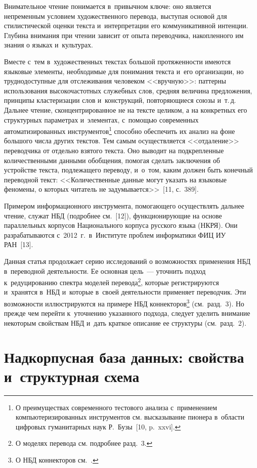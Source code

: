 \begin{multicols}{2}
  Внимательное чтение понимается в~привычном ключе: оно является 
непременным условием художественного перевода, выступая основой для 
стилистической оценки текста и~интерпретации его коммуникативной 
интенции. Глубина внимания при чтении зависит от опыта переводчика, 
накопленного им знания о языках и~культурах.
  
  Вместе с~тем в~художественных текстах большой протяженности имеются 
языковые элементы, необходимые для понимания текста и~его организации, 
но труднодоступные для отслеживания человеком <<вручную>>: паттерны 
использования высокочастотных служебных слов, средняя величина 
предложения, принципы кластеризации слов и~конструкций, повторяющиеся 
союзы и~т.\,д. Дальнее чтение, сконцентрированное не на тексте целиком, а 
на конкретных его структурных параметрах и~элементах, с~помощью 
современных автоматизированных инструментов\footnote[1]{О преимуществах 
современного тестового анализа с~применением компьютеризированных 
инструментов см. высказывание пионера в~области цифровых гуманитарных 
наук Р.~Бузы~[10, p.~xxvi].} способно обеспечить их анализ на фоне 
большого числа других текстов. Тем самым осуществляется <<отдаление>> 
переводчика от отдельно взятого текста. Оно выводит на подкрепленные 
количественными данными обобщения, помогая сделать заключения об 
устройстве текста, подлежащего переводу, и~о~том, каким должен быть 
конечный переводной текст: <<Количественные данные могут указать на 
языковые феномены, о которых читатель не задумывается>>~[11, с.~389].
  
  Примером информационного инструмента, помогающего осуществлять 
дальнее чтение, служат НБД (подробнее см.~[12]), функционирующие на 
основе параллельных корпусов Национального корпуса русского языка 
(НКРЯ). Они разрабатываются с~2012~г.\ в~Институте проблем информатики 
ФИЦ ИУ РАН~[13].
  
Данная статья продолжает серию исследований о возможностях применения НБД в~переводной 
деятельности. Ее основная цель~--- уточнить подход к~редуцированию спектра моделей 
перевода\footnote[2]{О моделях перевода см. подробнее разд.~3.}, которые регистрируются и~хранятся в~НБД 
и~которые в~своей деятельности применяет переводчик. Эти возможности иллюстрируются на примере НБД 
коннекторов\footnote[3]{О НБД коннекторов см.~\cite{12-n, 14-n}.} (см.\ разд.~3). Но прежде чем перейти 
к~уточнению указанного подхода, следует уделить внимание некоторым свойствам НБД и~дать краткое 
описание ее структуры (см.\ разд.~2).

    \section{Надкорпусная база данных: свойства и~структурная схема}
    

\end{multicols}

